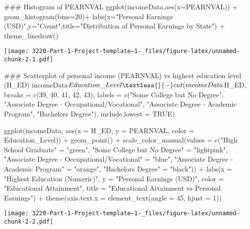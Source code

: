 \documentclass[
  12pt,
]{article}
\newenvironment{Shaded}{\begin{snugshade}}{\end{snugshade}}
\newcommand{\NormalTok}[1]{#1}
\begin{document}
\begin{Shaded}
\begin{Highlighting}[]
\NormalTok{\#\#\# Histogram of PEARNVAL}
\NormalTok{ggplot(incomeData,aes(x=PEARNVAL)) +}
\NormalTok{  geom\_histogram(bins=20)+}
\NormalTok{  labs(x="Personal Earnings (USD)",y="Count",title="Distribution of Personal Earnings by State") +}
\NormalTok{  theme\_linedraw()}
\end{Highlighting}
\end{Shaded}

\texttt{[image: 3220-Part-1-Project-template--1-\_files/figure-latex/unnamed-chunk-2-1.pdf]}

\begin{Shaded}
\begin{Highlighting}[]
\NormalTok{\#\#\#  Scatterplot of personal income (PEARNVAL) vs highest education level (H\_ED)}
\NormalTok{incomeData$Education\_Level \textless{}{-} cut(incomeData$H\_ED,}
\NormalTok{                            breaks = c(39, 40, 41, 42, 43),}
\NormalTok{                            labels = c("Some College but No Degree",}
\NormalTok{                                       "Associate Degree {-} Occupational/Vocational",}
\NormalTok{                                       "Associate Degree {-} Academic Program",}
\NormalTok{                                       "Bachelor\textquotesingle{}s Degree"),}
\NormalTok{                            include.lowest = TRUE)}

\NormalTok{ggplot(incomeData, aes(x = H\_ED, y = PEARNVAL, color = Education\_Level)) +}
\NormalTok{  geom\_point() +}
\NormalTok{  scale\_color\_manual(values = c("High School Graduate" = "green",}
\NormalTok{                                "Some College but No Degree" = "lightpink",}
\NormalTok{                                "Associate Degree {-} Occupational/Vocational" = "blue",}
\NormalTok{                                "Associate Degree {-} Academic Program" = "orange",}
\NormalTok{                                "Bachelor\textquotesingle{}s Degree" = "black")) +}
\NormalTok{  labs(x = "Highest Education (Numeric)", y = "Personal Earnings (USD)", color = "Educational Attainment", title = "Educational Attainment vs Personal Earnings") +}
\NormalTok{  theme(axis.text.x = element\_text(angle = 45, hjust = 1))}
\end{Highlighting}
\end{Shaded}

\texttt{[image: 3220-Part-1-Project-template--1-\_files/figure-latex/unnamed-chunk-2-2.pdf]}
\end{document}
